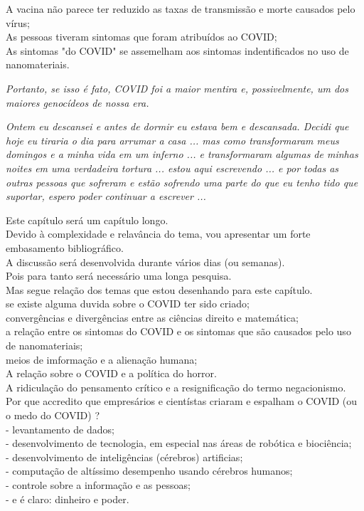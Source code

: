 \documentclass[11pt]{book}
\begin{document}
A vacina não parece ter reduzido as taxas de transmissão e morte causados pelo vírus; \\

As pessoas tiveram sintomas que foram atribuídos ao COVID; \\

As sintomas "do COVID" se assemelham aos sintomas indentificados no uso de nanomateriais. \\

\noindent \begin{center} \emph{Portanto, se isso é fato, COVID foi a maior mentira e, possivelmente, um dos maiores genocídeos de nossa era.} \end{center}

\noindent \begin{center} \emph{Ontem eu descansei e antes de dormir eu estava bem e descansada. Decidi que hoje eu tiraria o dia para arrumar a casa ... mas como transformaram meus domingos e a minha vida em um inferno ... e transformaram algumas de minhas noites em uma verdadeira tortura ... estou aqui escrevendo ... e por todas as outras pessoas que sofreram e estão sofrendo uma parte do que eu tenho tido que suportar, espero poder continuar a escrever ...} \end{center}

Este capítulo será um capítulo longo. \\
Devido à complexidade e relavância do tema, vou apresentar um forte embasamento bibliográfico. \\
A discussão será desenvolvida durante vários dias (ou semanas). \\
Pois para tanto será necessário uma longa pesquisa. \\

Mas segue relação dos temas que estou desenhando para este capítulo. \\

se existe alguma duvida sobre o COVID ter sido criado; \\
convergências e divergências entre as ciências direito e matemática; \\
a relação entre os sintomas do COVID e os sintomas que são causados pelo uso de nanomateriais; \\
meios de imformação e a alienação humana; \\
A relação sobre o COVID e a política do horror. \\

A ridiculação do pensamento crítico e a resignificação do termo negacionismo. \\

Por que accredito que empresários e cientístas criaram e espalham o COVID (ou o medo do COVID) ? \\

- levantamento de dados; \\
- desenvolvimento de tecnologia, em especial nas áreas de robótica e biociência; \\
- desenvolvimento de inteligências (cérebros) artificias; \\
- computação de altíssimo desempenho usando cérebros humanos; \\
- controle sobre a informação e as pessoas; \\
- e é claro: dinheiro e poder.
\end{document}
